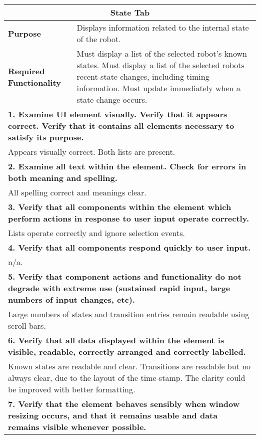\begin{longtable}{ l p{10cm} }
 \hline
 \multicolumn{2}{c}{\textbf{State Tab}}\\
 \hline
 \textbf{Purpose} & Displays information related to the internal state of the robot.\\
 \textbf{Required Functionality} & Must display a list of the selected robot's known states. Must display a list of the selected robots recent state changes, including timing information. Must update immediately when a state change occurs.\\
 \hline
 \multicolumn{2}{p{14cm}}{\textbf{1. Examine UI element visually. Verify that it appears correct. Verify that it contains all elements necessary to satisfy its purpose.}}\\
 \multicolumn{2}{p{14cm}}{Appears visually correct. Both lists are present.}\\
 \hline
 \multicolumn{2}{p{14cm}}{\textbf{2. Examine all text within the element. Check for errors in both meaning and spelling.}}\\
 \multicolumn{2}{p{14cm}}{All spelling correct and meanings clear.}\\
 \hline
 \multicolumn{2}{p{14cm}}{\textbf{3. Verify that all components within the element which perform actions in response to user input operate correctly.}}\\
 \multicolumn{2}{p{14cm}}{Lists operate correctly and ignore  selection events.}\\
 \hline
 \multicolumn{2}{p{14cm}}{\textbf{4. Verify that all components respond quickly to user input.}}\\
 \multicolumn{2}{p{14cm}}{n/a.}\\
 \hline
 \multicolumn{2}{p{14cm}}{\textbf{5. Verify that component actions and functionality do not degrade with extreme use (sustained rapid input, large numbers of input changes, etc).}}\\
 \multicolumn{2}{p{14cm}}{Large numbers of states and transition entries remain readable using scroll bars.}\\
 \hline
 \multicolumn{2}{p{14cm}}{\textbf{6. Verify that all data displayed within the element is visible, readable, correctly arranged and correctly labelled.}}\\
 \multicolumn{2}{p{14cm}}{Known states are readable and clear. Transitions are readable but no always clear, due to the layout of the time-stamp. The clarity could be improved with better formatting.}\\
 \hline
 \multicolumn{2}{p{14cm}}{\textbf{7. Verify that the element behaves sensibly when window resizing occurs, and that it remains usable and data remains visible whenever possible.}}\\

\end{longtable}
